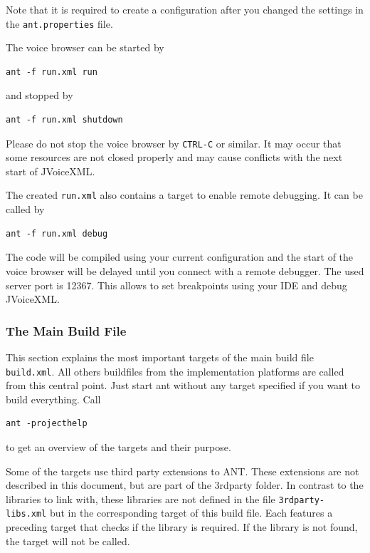 \documentclass[11pt,a4paper]{article}
\begin{document}
Note that it is required to create a configuration after you changed the
settings in the \texttt{ant.properties} file.

The voice browser can be started by
\begin{lstlisting}
ant -f run.xml run
\end{lstlisting}
and stopped by
\begin{lstlisting}
ant -f run.xml shutdown
\end{lstlisting}

Please do not stop the voice browser by \texttt{CTRL-C} or similar. It may occur
that some resources are not closed properly and may cause conflicts with the next
start of JVoiceXML.

The created \texttt{run.xml} also contains a target to enable remote
debugging. It can be called by
\begin{lstlisting}
ant -f run.xml debug
\end{lstlisting}
The code will be compiled using your current configuration and the start of the
voice browser will be delayed until you connect with a remote debugger. The
used server port is 12367. This allows to set breakpoints using your IDE and
debug JVoiceXML.

\subsubsection{The Main Build File}
\label{sec:ant-build-file}

This section explains the most important targets of the main build file
\texttt{build.xml}. All others buildfiles from the implementation platforms
are called from this central point. Just start ant without any target specified
if you want to build everything. Call
\begin{lstlisting}
ant -projecthelp
\end{lstlisting}
to get an overview of the targets and their purpose.

Some of the targets use third party extensions to ANT. These 
extensions are not described in this document, but are part of
the 3rdparty folder. In contrast to the libraries to link with,
these libraries are not defined in the file \texttt{3rdparty-libs.xml}
but in the corresponding target of this build file. Each features
a preceding target that checks if the library is required. If
the library is not found, the target will not be called.
\end{document}

